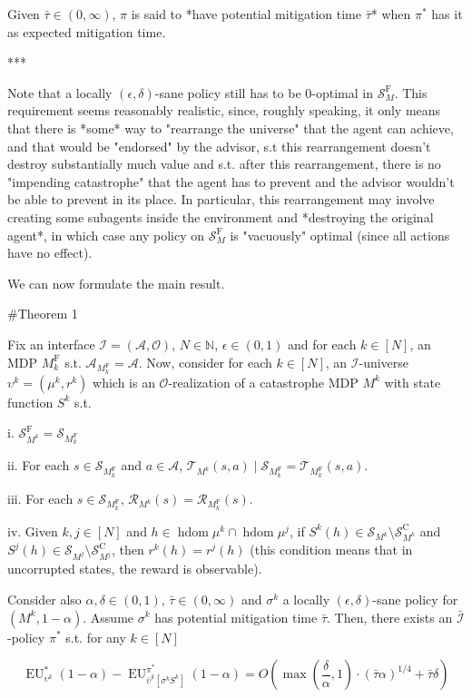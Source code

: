 \documentclass[a4paper]{article}
\newcommand{\AP}[1]{\left(#1\right)}
\newcommand{\AB}[1]{\left[#1\right]}
\newcommand{\Nats}{\mathbb{N}}
\newcommand{\Ob}{\mathcal{O}}
\newcommand{\A}{\mathcal{A}}
\newcommand{\St}{\mathcal{S}}
\newcommand{\T}{\mathcal{T}}
\newcommand{\R}{\mathcal{R}}
\newcommand{\In}{\mathcal{I}}
\newcommand{\Adi}{{\bar{\In}}}
\DeclareMathOperator{\HD}{hdom}
\newcommand{\RMC}{\mathrm{C}}
\newcommand{\RMF}{\mathrm{F}}
\newcommand{\SF}{\St^{\RMF}}
\newcommand{\SC}{\St^{\RMC}}
\newcommand{\MF}{M^{\RMF}}
\newcommand{\EU}{\operatorname{EU}}
\begin{document}
Given $\bar{\tau} \in (0,\infty)$, $\pi$ is said to *have potential mitigation time $\bar{\tau}$* when $\pi^*$ has it as expected mitigation time.

***

Note that a locally $(\epsilon,\delta)$-sane policy still has to be $0$-optimal in $\SF_M$. This requirement seems reasonably realistic, since, roughly speaking, it only means that there is *some* way to "rearrange the universe" that the agent can achieve, and that would be "endorsed" by the advisor, s.t this rearrangement doesn't destroy substantially much value and s.t. after this rearrangement, there is no "impending catastrophe" that the agent has to prevent and the advisor wouldn't be able to prevent in its place. In particular, this rearrangement may involve creating some subagents inside the environment and *destroying the original agent*, in which case any policy on $\SF_M$ is "vacuously" optimal (since all actions have no effect).

We can now formulate the main result.

\#Theorem 1

Fix an interface $\In=(\A,\Ob)$, $N \in \Nats$, $\epsilon \in (0,1)$ and for each $k \in [N]$, an MDP $\MF_k$ s.t. $\A_{\MF_k} = \A$. Now, consider for each $k \in [N]$, an $\In$-universe $\upsilon^k=(\mu^k,r^k)$ which is an $\Ob$-realization of a catastrophe MDP $M^k$ with state function $S^k$ s.t.

i. $\SF_{M^k} = \St_{\MF_k}$

ii. For each $s \in \St_{\MF_k}$ and $a \in \A$, $\T_{M^k}(s,a) \mid \St_{\MF_k} = \T_{\MF_k}(s,a)$.

iii. For each $s \in \St_{\MF_k}$, $\R_{M^k}(s)=\R_{\MF_k}(s)$.

iv. Given $k,j \in [N]$ and $h \in \HD{\mu^k} \cap \HD{\mu^j}$, if $S^k(h) \in \St_{M^k} \setminus \SC_{M^k}$ and $S^j(h) \in \St_{M^j} \setminus \SC_{M^j}$, then $r^k(h)=r^j(h)$ (this condition means that in uncorrupted states, the reward is observable).

Consider also $\alpha,\delta\in(0,1)$, $\bar{\tau} \in (0,\infty)$ and $\sigma^k$ a locally $(\epsilon,\delta)$-sane policy for $(M^k,1-\alpha)$. Assume $\sigma^k$ has potential mitigation time $\bar{\tau}$. Then, there exists an $\Adi$-policy $\pi^*$ s.t. for any $k \in [N]$

$$\EU_{\upsilon^k}^*(1-\alpha) - \EU_{\bar{\upsilon}^k\AB{\sigma^kS^k}}^{\pi^*}(1-\alpha) = O\AP{\max\AP{\frac{\delta}{\alpha},1}\cdot(\bar{\tau}\alpha)^{1/4}+\bar{\tau}\delta}$$
\end{document}

